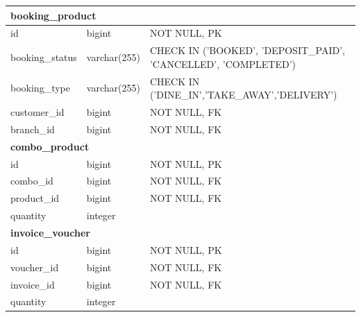 \begin{longtable}{|p{3.5cm}|p{3.5cm}|p{7.5cm}|}
	\multicolumn{3}{|l|}{\textbf{booking\_product}}                                                                     \\
	\hline
	id                  & bigint                & NOT NULL, PK                                                          \\
	booking\_status     & varchar(255)          & CHECK IN ('BOOKED', 'DEPOSIT\_PAID', 'CANCELLED', 'COMPLETED')        \\
	booking\_type       & varchar(255)          & CHECK IN ('DINE\_IN','TAKE\_AWAY','DELIVERY')                         \\
	customer\_id        & bigint                & NOT NULL, FK                                                          \\
	branch\_id          & bigint                & NOT NULL, FK                                                          \\
	\hline

	\multicolumn{3}{|l|}{\textbf{combo\_product}}                                                                       \\
	\hline
	id                  & bigint                & NOT NULL, PK                                                          \\
	combo\_id           & bigint                & NOT NULL, FK                                                          \\
	product\_id         & bigint                & NOT NULL, FK                                                          \\
	quantity            & integer               &                                                                       \\
	\hline

	\multicolumn{3}{|l|}{\textbf{invoice\_voucher}}                                                                     \\
	\hline
	id                  & bigint                & NOT NULL, PK                                                          \\
	voucher\_id         & bigint                & NOT NULL, FK                                                          \\
	invoice\_id         & bigint                & NOT NULL, FK                                                          \\
	quantity            & integer               &                                                                       \\
	\hline
\end{longtable}

